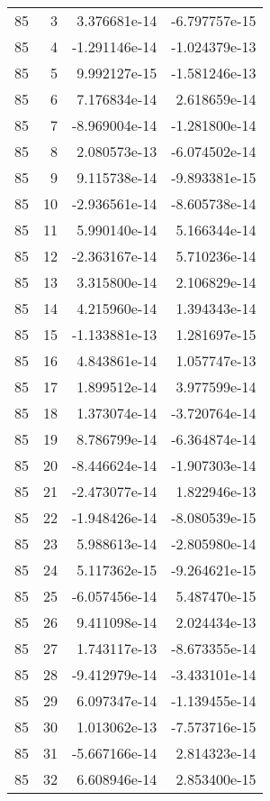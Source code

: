 \begin{tabular}{rrrr}
  85 &    3 &  3.376681e-14 & -6.797757e-15 \\
  85 &    4 & -1.291146e-14 & -1.024379e-13 \\
  85 &    5 &  9.992127e-15 & -1.581246e-13 \\
  85 &    6 &  7.176834e-14 &  2.618659e-14 \\
  85 &    7 & -8.969004e-14 & -1.281800e-14 \\
  85 &    8 &  2.080573e-13 & -6.074502e-14 \\
  85 &    9 &  9.115738e-14 & -9.893381e-15 \\
  85 &   10 & -2.936561e-14 & -8.605738e-14 \\
  85 &   11 &  5.990140e-14 &  5.166344e-14 \\
  85 &   12 & -2.363167e-14 &  5.710236e-14 \\
  85 &   13 &  3.315800e-14 &  2.106829e-14 \\
  85 &   14 &  4.215960e-14 &  1.394343e-14 \\
  85 &   15 & -1.133881e-13 &  1.281697e-15 \\
  85 &   16 &  4.843861e-14 &  1.057747e-13 \\
  85 &   17 &  1.899512e-14 &  3.977599e-14 \\
  85 &   18 &  1.373074e-14 & -3.720764e-14 \\
  85 &   19 &  8.786799e-14 & -6.364874e-14 \\
  85 &   20 & -8.446624e-14 & -1.907303e-14 \\
  85 &   21 & -2.473077e-14 &  1.822946e-13 \\
  85 &   22 & -1.948426e-14 & -8.080539e-15 \\
  85 &   23 &  5.988613e-14 & -2.805980e-14 \\
  85 &   24 &  5.117362e-15 & -9.264621e-15 \\
  85 &   25 & -6.057456e-14 &  5.487470e-15 \\
  85 &   26 &  9.411098e-14 &  2.024434e-13 \\
  85 &   27 &  1.743117e-13 & -8.673355e-14 \\
  85 &   28 & -9.412979e-14 & -3.433101e-14 \\
  85 &   29 &  6.097347e-14 & -1.139455e-14 \\
  85 &   30 &  1.013062e-13 & -7.573716e-15 \\
  85 &   31 & -5.667166e-14 &  2.814323e-14 \\
  85 &   32 &  6.608946e-14 &  2.853400e-15 \\

\end{tabular}
